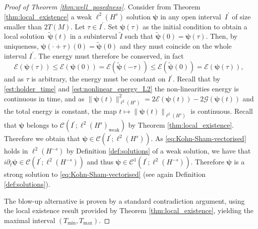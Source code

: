 \documentclass[12pt,a4paper]{amsart}
\numberwithin{equation}{section}
\newcommand{\ulpsi}{\boldsymbol{\psi}}
\begin{document}
	\begin{proof}[Proof of Theorem \ref{thm:well_posedness}]\label{proof:well_posedness}
		Consider from Theorem \ref{thm:local_existence} a weak $\ell^2(H^s)$ solution $ \ulpsi $ in any open interval~$I^\prime$ of size smaller than $2T(M)$. Let $\tau \in I^\prime$. Set $\ulpsi(\tau)$ as the initial condition to obtain a local solution~$\tilde{\ulpsi}(t)$ in a subinterval $\tilde{I}$ such that $ \tilde{\ulpsi}(0) = \ulpsi(\tau)$. Then, by uniqueness, $\ulpsi(\cdot+\tau) (0) = \tilde{\ulpsi}(0) $ and they must coincide on the whole interval $I^\prime$. The energy must therefore be conserved, in fact 
		\begin{equation} 
			\mathcal{E}(\ulpsi(\tau)) \leq \mathcal{E}(\ulpsi(0)) = \mathcal{E}(\tilde{\ulpsi}(-\tau)) \leq \mathcal{E}(\tilde{\ulpsi}(0)) = \mathcal{E}(\ulpsi(\tau)),
		\end{equation}
		and as $\tau$ is arbitrary, the energy must be constant on $I^\prime$. Recall that by \eqref{est:holder_time} and \eqref{est:nonlinear_energy_L2} the non-linearities energy is continuous in time, and as $ \| \ulpsi(t) \|_{\ell^2(H^s)}^2 = 2 \mathcal{E}(\ulpsi(t)) - 2 \mathscr{G}(\ulpsi(t)) $ and the total energy is constant, the map $ t \mapsto \| \ulpsi(t) \|_{\ell^2(H^s)} $ is continuous. Recall that $ \ulpsi$ belongs to $\mathscr{C}(I^\prime;\ell^2(H^s)_{\mathrm{weak}}) $ by Theorem \ref{thm:local_existence}. Therefore we obtain that $ \ulpsi \in \mathscr{C}(I^\prime;\ell^2(H^s)) $. As \eqref{eq:Kohn-Sham-vectorised} holds in $\ell^2(H^{-s}) $ by Definition \ref{def:solutions} of a weak solution, we have that $ i \partial_t \ulpsi \in \mathscr{C}(I^\prime;\ell^2(H^{-s})) $ and thus $ \ulpsi \in \mathscr{C}^1(I^\prime; \ell^{2}(H^{-s}))$. Therefore $\ulpsi$ is a strong solution to \eqref{eq:Kohn-Sham-vectorised} (see again Definition \ref{def:solutions}).
		
		The blow-up alternative is proven by a standard contradiction argument, using the local existence result provided by Theorem \ref{thm:local_existence}, yielding the maximal interval $(T_{\mathrm{min}},T_{\mathrm{max}})$. 
		

\end{proof}
\end{document}
